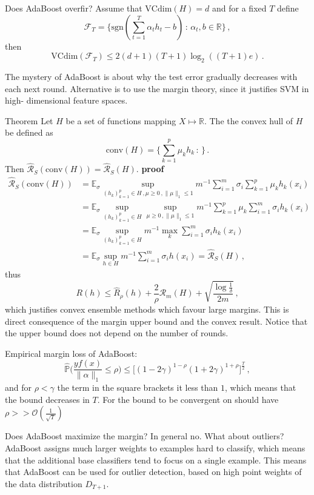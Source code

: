 \documentclass[a4paper]{article}
\newcommand{\Real}{\mathbb{R}}
\newcommand{\ex}{\mathbb{E}}
\newcommand{\pr}{\mathbb{P}}
\begin{document}
Does AdaBoost overfir? Assume that $\text{VCdim}(H) = d$ and for a fixed $T$ define
\[\mathcal{F}_T
    = \{ \text{sgn}(\sum_{t=1}^T \alpha_t h_t  - b)
        \,:\, \alpha_t, b\in \Real\}\,,\]
then
\[ \text{VCdim}(\mathcal{F}_T) \leq 2(d+1)(T+1)\log_2((T+1)e) \,. \]

The mystery of AdaBoost is about why the test error gradually decreases with each
next round. Alternative is to use the margin theory, since it justifies SVM in high-
dimensional feature spaces.

Theorem Let $H$ be a set of functions mapping $X\mapsto\Real$. The the convex hull
of $H$ be defined as 
\[\text{conv}(H) = \{\sum_{k=1}^p \mu_k h_k\,:\, \}\,.\]
Then $\hat{\mathcal{R}}_S(\text{conv}(H)) = \hat{\mathcal{R}}_S(H)$.
\textbf{proof}
\begin{align*}
    \hat{\mathcal{R}}_S(\text{conv}(H))
    & = \ex_\sigma \sup_{(h_k)_{k=1}^p\in H\,,\mu\geq0\,,\|\mu\|_1\leq 1}
        m^{-1} \sum_{i=1}^m \sigma_i \sum_{k=1}^p \mu_k h_k(x_i) \\
    & = \ex_\sigma \sup_{(h_k)_{k=1}^p\in H} \sup_{\mu\geq0\,,\|\mu\|_1\leq 1}
        m^{-1} \sum_{k=1}^p \mu_k \sum_{i=1}^m \sigma_i h_k(x_i) \\
    & = \ex_\sigma \sup_{(h_k)_{k=1}^p\in H}
            m^{-1} \max_k \sum_{i=1}^m \sigma_i h_k(x_i) \\
    & = \ex_\sigma \sup_{h\in H} m^{-1} \sum_{i=1}^m \sigma_i h(x_i)
    = \hat{\mathcal{R}}_S(H)\,,
\end{align*}
thus
\[ R(h) \leq \hat{R}_\rho(h) + \frac{2}{\rho} \mathcal{R}_m(H)
        + \sqrt{\frac{\log\frac{1}{\delta}}{2m}}
    \,, \]
which justifies convex ensemble methods which favour large margins.
This is direct consequence of the margin upper bound and the convex result.
Notice that the upper bound does not depend on the number of rounds.

Empirical margin loss of AdaBoost:
\[ \hat{\pr} \bigl( \frac{yf(x)}{\|\alpha\|_1} \leq \rho \bigr)
    \leq \bigl[(1-2\gamma)^{1-\rho} (1+2\gamma)^{1+\rho} \bigr]^\frac{T}{2}
    \,,\]
and for $\rho < \gamma$ the term in the square brackets it less than $1$, which
means that the bound decreases in $T$. For the bound to be convergent on should
have $\rho >> \mathcal{O}(\frac{1}{\sqrt{T}})$

Does AdaBoost maximize the margin? In general no.
What about outliers? AdaBoost assigns much larger weights to examples hard to classify,
which means that the additional base classifiers tend to focus on a single example.
This means that AdaBoost can be used for outlier detection, based on high point
weights of the data distribution $D_{T+1}$.
\end{document}
